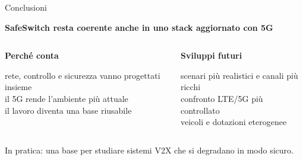 \documentclass[aspectratio=169,10pt]{beamer}
\begin{document}
\begin{frame}{Conclusioni}
  \begin{beamercolorbox}[rounded=true,sep=1em,wd=\linewidth]{}
    \centering
    \Large\textbf{\color{UnibsBlue}SafeSwitch resta coerente anche in uno stack aggiornato con 5G}
  \end{beamercolorbox}

  \vspace{1em}
  \begin{columns}[T,totalwidth=\textwidth]
      \begin{beamercolorbox}[rounded=true,sep=0.9em,wd=\linewidth]{}
        \textbf{\color{UnibsBlue}Perché conta}

        \small\color{SoftText}
        rete, controllo e sicurezza vanno progettati insieme\\[0.3em]
        il 5G rende l'ambiente più attuale\\[0.3em]
        il lavoro diventa una base riusabile
      \end{beamercolorbox}

      \begin{beamercolorbox}[rounded=true,sep=0.9em,wd=\linewidth]{}
        \textbf{\color{UnibsBlue}Sviluppi futuri}

        \small\color{SoftText}
        scenari più realistici e canali più ricchi\\[0.3em]
        confronto LTE/5G più controllato\\[0.3em]
        veicoli e dotazioni eterogenee
      \end{beamercolorbox}
  \end{columns}

  \vspace{1em}
  \centering
  {\small\color{SoftText}In pratica: una base per studiare sistemi V2X che si degradano in modo sicuro.}
\end{frame}
\end{document}
